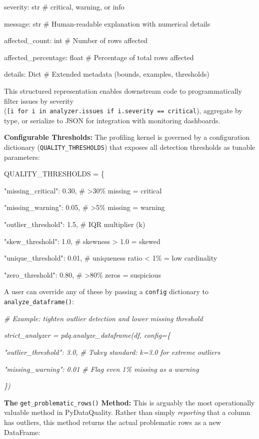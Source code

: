 \documentclass{article}
\begin{document}
severity: str \# \textquotesingle critical\textquotesingle,
\textquotesingle warning\textquotesingle, or
\textquotesingle info\textquotesingle{}

message: str \# Human-readable explanation with numerical details

affected\_count: int \# Number of rows affected

affected\_percentage: float \# Percentage of total rows affected

details: Dict \# Extended metadata (bounds, examples, thresholds)

This structured representation enables downstream code to
programmatically filter issues by severity
(\texttt{{[}i~for~i~in~analyzer.issues~if~i.severity~==~critical}),
aggregate by type, or serialize to JSON for integration with monitoring
dashboards.

\textbf{Configurable Thresholds:} The profiling kernel is governed by a
configuration dictionary (\texttt{QUALITY\_THRESHOLDS}) that exposes all
detection thresholds as tunable parameters:

QUALITY\_THRESHOLDS = \{

"missing\_critical": 0.30, \# \textgreater30\% missing = critical

"missing\_warning": 0.05, \# \textgreater5\% missing = warning

"outlier\_threshold": 1.5, \# IQR multiplier (k)

"skew\_threshold": 1.0, \# \textbar skewness\textbar{} \textgreater{}
1.0 = skewed

"unique\_threshold": 0.01, \# uniqueness ratio \textless{} 1\% = low
cardinality

"zero\_threshold": 0.80, \# \textgreater80\% zeros = suspicious

A user can override any of these by passing a \texttt{config} dictionary
to \texttt{analyze\_dataframe()}:

\emph{\# Example: tighten outlier detection and lower missing threshold}

\emph{strict\_analyzer = pdq.analyze\_dataframe(df, config=\{}

\emph{"outlier\_threshold": 3.0, \# Tukey standard: k=3.0 for extreme
outliers}

\emph{"missing\_warning": 0.01 \# Flag even 1\% missing as a warning}

\emph{\})}

\textbf{The} \texttt{get\_problematic\_rows()} \textbf{Method:} This is
arguably the most operationally valuable method in PyDataQuality. Rather
than simply \emph{reporting} that a column has outliers, this method
returns the actual problematic rows as a new DataFrame:
\end{document}
